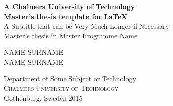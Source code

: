 
\begin{titlepage}
			
\addtolength{\voffset}{2cm}


\mbox{}
\vfill
\renewcommand{\familydefault}{\sfdefault} \normalfont %
\textbf{{\Huge 	A Chalmers University of Technology 	\\[0.2cm] 
				Master's thesis template for \LaTeX}} 	\\[0.5cm]
{\Large A Subtitle that can be Very Much Longer if Necessary}\\[0.5cm]
Master's thesis in Master Programme Name \setlength{\parskip}{1cm}

{\Large NAME SURNAME} \setlength{\parskip}{2.9cm}\\
{\Large NAME SURNAME} \setlength{\parskip}{2.9cm}

Department of Some Subject or Technology \\
\textsc{Chalmers University of Technology} \\
Gothenburg, Sweden 2015

\renewcommand{\familydefault}{\rmdefault} \normalfont %
\end{titlepage}


\newpage
\restoregeometry
\thispagestyle{empty}
\mbox{}


